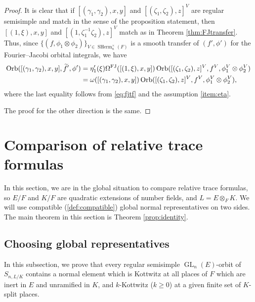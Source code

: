\documentclass[11pt, reqno]{amsart}
\numberwithin{equation}{subsection}
\theoremstyle{plain}
\theoremstyle{definition}
\newcommand{\wt}{\widetilde}
\DeclareMathOperator{\GL}{GL}
\DeclareMathOperator{\Orb}{Orb}
\DeclareMathOperator{\SHerm}{SHerm}
\newcommand{\FJ}{\textnormal{FJ}}
\begin{document}
\begin{proof}
It is clear that if $[(\gamma_1, \gamma_2), x, y]$ and
$[(\zeta_1, \zeta_2), z]^V$ are regular semisimple 
and match in the sense of the proposition
statement, then $[(1, \xi), x, y]$ and 
$[(1, \zeta_1^{-1}\zeta_2), z]^V$
match as in Theorem \ref{thm:FJtransfer}.
Thus, since $\{(f, \phi_1 \otimes \phi_2)\}_{V \in \SHerm_n^\times(F)}$ is a smooth
transfer of $(f', \phi')$ for the Fourier--Jacobi
orbital integrals, we have
\begin{align*}
\Orb([(\gamma_1, \gamma_2), x, y], \wt f', \phi') 
&= \eta_1'(\xi)\Omega^{\FJ}([(1, \xi), x, y])
\Orb([(\zeta_1, \zeta_2), z]^V, f^V, \phi_1^V \otimes \phi_2^V)\\
&= \omega([(\gamma_1, \gamma_2), x, y])
\Orb([(\zeta_1, \zeta_2), z]^V, f^V, \phi_1^V \otimes \phi_2^V),
\end{align*}
where the last equality follows from \eqref{eq:fjtf}
and the assumption \eqref{item:eta}.

The proof for the other direction is the same.
\end{proof}

\section{Comparison of relative trace formulas} \label{section: comparison RTF}

In this section, we are in the global situation to compare relative trace formulas, so $E/F$ and $K/F$ are quadratic extensions of number fields, and $L=E \otimes_F K$. We will use compatible (\ref{def:compatible}) global normal representatives on two sides. The main theorem in this section is Theorem \ref{prop:identity}.




\subsection{Choosing global representatives}
In this subsection, we prove that every regular semisimple
$\GL_n(E)$-orbit of $S_{n,L/K}$ contains a normal element which
is Kottwitz at all places of $F$ which are inert in $E$ and unramified in $K$, and $k$-Kottwitz ($k \geq 0$) at a given finite set of $K$-split places.
\end{document}

